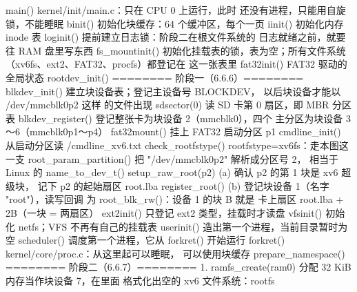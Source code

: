 \begin{txtcode}
main()                                 kernel/init/main.c：只在 CPU 0 上运行，此时
                                       还没有进程，只能用自旋锁，不能睡眠
  binit()                              初始化块缓存：64 个缓冲区，每个一页
  iinit()                              初始化内存 inode 表
    loginit()                          提前建立日志锁：阶段二在根文件系统的
                                       日志就绪之前，就要往 RAM 盘里写东西
    fs_mountinit()                     初始化挂载表的锁，表为空；所有文件系统
                                       （xv6fs、ext2、FAT32、procfs）都登记在
                                       这一张表里
  fat32init()                          FAT32 驱动的全局状态
  rootdev_init()                       ======== 阶段一（6.6.6）========
    blkdev_init()                      建立块设备表；登记主设备号 BLOCKDEV，
                                       以后块设备才能以 /dev/mmcblk0p2 这样
                                       的文件出现
    sdsector(0)                        读 SD 卡第 0 扇区，即 MBR 分区表
    blkdev_register()                  登记整张卡为块设备 2（mmcblk0），四个
                                       主分区为块设备 3～6（mmcblk0p1～p4）
    fat32mount()                       挂上 FAT32 启动分区 p1
    cmdline_init()                     从启动分区读 /cmdline_xv6.txt
    check_rootfstype()                 rootfstype=xv6fs：走本图这一支
    root_param_partition()             把 "/dev/mmcblk0p2" 解析成分区号 2，
                                       相当于 Linux 的 name_to_dev_t()
    setup_raw_root(p2)            (a)  确认 p2 的第 1 块是 xv6 超级块，
                                       记下 p2 的起始扇区 root.lba
    register_root()               (b)  登记块设备 1（名字 "root"），读写回调
                                       为 root_blk_rw()：设备 1 的块 B 就是
                                       卡上扇区 root.lba + 2B（一块 = 两扇区）
  ext2init()                           只登记 ext2 类型，挂载时才读盘
  vfsinit()                            初始化 netfs；VFS 不再有自己的挂载表
  userinit()                           造出第一个进程，当前目录暂时为空
  scheduler()                          调度第一个进程，它从 forkret() 开始运行
forkret()                              kernel/core/proc.c：从这里起可以睡眠，
                                       可以使用块缓存
  prepare_namespace()                  ======== 阶段二（6.6.7）========
    1. ramfs_create(ram0)              分配 32 KiB 内存当作块设备 7，在里面
                                       格式化出空的 xv6 文件系统：rootfs

\end{txtcode}
